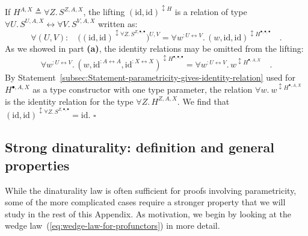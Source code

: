 If $H^{A,X}\triangleq\forall Z.\,S^{Z,A,X}$, the lifting $(\text{id},\text{id})^{\updownarrow H}$
is a relation of type $\forall U.\,S^{U,A,X}\leftrightarrow\forall V.\,S^{V,A,X}$
written as:
\[
\forall(U,V):\quad\big((\text{id},\text{id})^{\updownarrow\forall Z.\,S^{Z,\bullet,\bullet}}\big)^{U,V}=\forall w^{:U\leftrightarrow V}.\,(w,\text{id},\text{id})^{\updownarrow H^{\bullet,\bullet,\bullet}}\quad.
\]
As we showed in part \textbf{(a)}, the identity relations may be omitted
from the lifting:
\[
\forall w^{:U\leftrightarrow V}.\,(w,\text{id}^{:A\leftrightarrow A},\text{id}^{:X\leftrightarrow X})^{\updownarrow H^{\bullet,\bullet,\bullet}}=\forall w^{:U\leftrightarrow V}.\,w^{\updownarrow H^{\bullet,A,X}}\quad.
\]
By Statement~\ref{subsec:Statement-parametricity-gives-identity-relation}
used for $H^{\bullet,A,X}$ as a type constructor with one type parameter,
the relation $\forall w.\:w^{\updownarrow H^{\bullet,A,X}}$ is the
identity relation for the type $\forall Z.\,H^{Z,A,X}$. We find that
$(\text{id},\text{id})^{\updownarrow\forall Z.\,S^{Z,\bullet,\bullet}}=\text{id}$.
$\square$

\begin{comment}
commutativity law does not hold!
\end{comment}


\subsection{Strong dinaturality: definition and general properties\label{subsec:Strong-dinaturality.-General-properties}}

While the dinaturality law is often sufficient for proofs involving
parametricity, some of the more complicated cases require a stronger
property that we will study in the rest of this Appendix. As motivation,
we begin by looking at the wedge law~(\ref{eq:wedge-law-for-profunctors})
in more detail.


